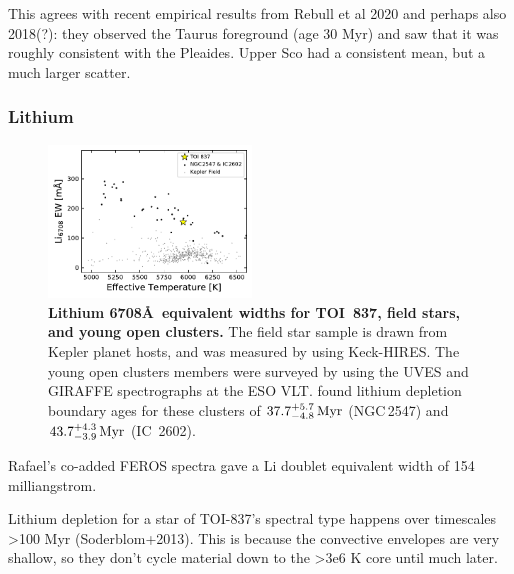 \documentclass[12pt,twocolumn,tighten]{aastex62}
\newcommand{\tn}{TOI~837} %
\newcommand{\cn}{IC~2602} %
\begin{document}
This agrees with recent empirical results from Rebull et al 2020 and perhaps also 2018(?):
they observed the Taurus foreground (age 30 Myr) and saw that it was 
roughly consistent with the Pleaides.
Upper Sco had a consistent mean, but a much larger scatter.



\subsubsection{Lithium}

\begin{figure}[t!]
	\begin{center}
		\leavevmode
		\includegraphics[width=0.48\textwidth]{f5.pdf}
	\end{center}
	\vspace{-0.7cm}
	\caption{
    {\bf Lithium 6708\AA\ equivalent widths for \tn, field stars, and
    young open clusters.}
    The field star sample is drawn from Kepler planet hosts,
    and was measured by
    \citet{berger_identifying_2018} using Keck-HIRES.
    The young open clusters members were surveyed by
    \citet{randich_gaiaeso_2018} using the UVES and GIRAFFE
    spectrographs at the ESO VLT.  \citet{randich_gaiaeso_2018}
    found lithium depletion boundary ages for these clusters of
    $37.7^{+5.7}_{-4.8}\,{\rm Myr}$ (NGC$\,$2547) and
    $43.7^{+4.3}_{-3.9}\,{\rm Myr}$ (\cn).
    \label{fig:lithium}
	}
\end{figure}

Rafael's co-added FEROS spectra gave a Li doublet equivalent width of
154 milliangstrom.

Lithium depletion for a star of TOI-837's spectral type happens
over timescales >100 Myr (Soderblom+2013). This is because the
convective envelopes are very shallow, so they don't cycle material
down to the >3e6 K core until much later.
\end{document}
